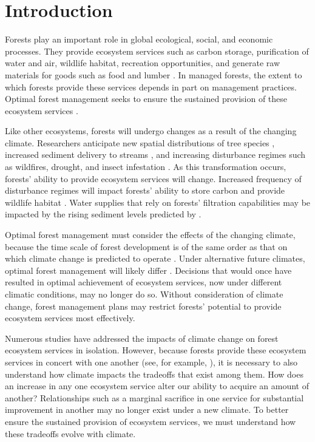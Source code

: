 
\section{Introduction}
 
Forests play an important role in global ecological, social, and economic processes. They provide ecosystem services such as carbon storage, purification of water and air, wildlife habitat, recreation opportunities, and generate raw materials for goods such as food and lumber \cite{daily1997ecosystem}. In managed forests, the extent to which forests provide these services depends in part on management practices. Optimal forest management seeks to ensure the sustained provision of these ecosystem services \cite{cfrForestMgmt}.

Like other ecosystems, forests will undergo changes as a result of the changing climate. Researchers anticipate new spatial distributions of tree species \cite{iverson1998predicting}, increased sediment delivery to streams \cite{Goode20121}, and increasing disturbance regimes such as wildfires, drought, and insect infestation \cite{vose2012effects}. As this transformation occurs, forests' ability to provide ecosystem services will change. Increased frequency of disturbance regimes will impact forests' ability to store carbon \cite{bonan2008forests} and provide wildlife habitat \cite{mckenzie2004climatic}. Water supplies that rely on forests' filtration capabilities may be impacted by the rising sediment levels predicted by \cite{Goode20121}.

Optimal forest management must consider the effects of the changing climate, because the time scale of forest development is of the same order as that on which climate change is predicted to operate \cite{ipcc2013climate}. Under alternative future climates, optimal forest management will likely differ \cite{linder2000developing}. Decisions that would once have resulted in optimal achievement of ecosystem services, now under different climatic conditions, may no longer do so. Without consideration of climate change, forest management plans may restrict forests' potential to provide ecosystem services most effectively.

Numerous studies have addressed the impacts of climate change on forest ecosystem services in isolation\cite{vose2012effects}\cite{bonan2008forests}\cite{mckenzie2004climatic}. However, because forests provide these ecosystem services in concert with one another (see, for example, \cite{toth2009finding}), it is necessary to also understand how climate impacts the tradeoffs that exist among them. How does an increase in any one ecosystem service alter our ability to acquire an amount of another? Relationships such as a marginal sacrifice in one service for substantial improvement in another may no longer exist under a new climate. To better ensure the sustained provision of ecosystem services, we must understand how these tradeoffs evolve with climate.

